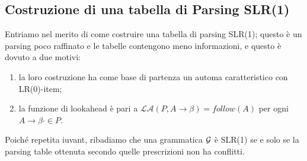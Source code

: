 \documentclass[class=book, crop=false, oneside, 12pt]{standalone}
\begin{document}
\subsection{Costruzione di una tabella di Parsing SLR(1)}
Entriamo nel merito di come costruire una tabella di parsing SLR(1); questo è un parsing poco raffinato e le tabelle contengono meno informazioni, e questo è dovuto a due motivi:
\begin{enumerate}
    \item la loro costruzione ha come base di partenza un automa caratteristico con LR(0)-item;
    \item la funzione di lookahead è pari a \(\mathcal{LA}(P, A \rightarrow \beta) = follow(A)\) per ogni \(A \rightarrow \beta \cdot \in P\).
\end{enumerate}
Poiché repetita iuvant, ribadiamo che una grammatica \(\mathcal{G}\) è SLR(1) se e solo se la parsing table ottenuta secondo quelle prescrizioni non ha conflitti.
\end{document}
